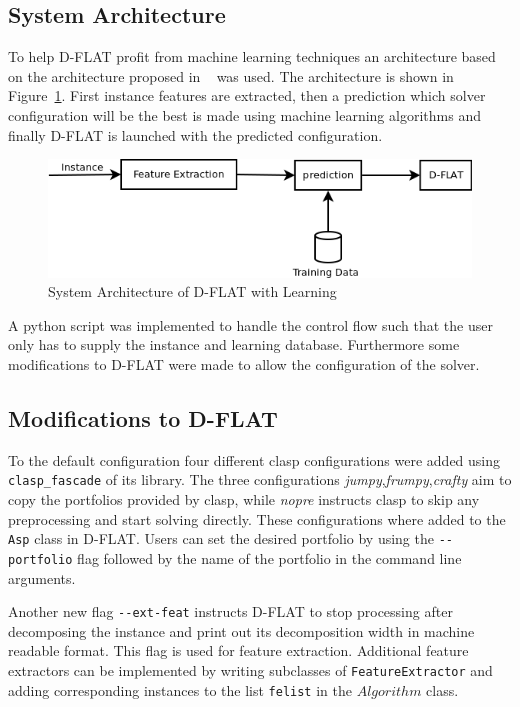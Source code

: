 \subsection{System Architecture}
To help D-FLAT profit from machine learning techniques an architecture based on the architecture proposed in ~\cite{DBLP:conf/lpnmr/GebserKKSSZ11} was used. The architecture is shown in Figure~\ref{impl:sysarch}. First instance features are extracted, then a prediction which solver configuration will be the best is made using machine learning algorithms and finally D-FLAT is launched with the predicted configuration.
\begin{figure}[h]
	\center
	\includegraphics[scale=0.6]{figures/sysarch.png}
	\caption{System Architecture of D-FLAT with Learning\label{impl:sysarch}}
\end{figure}
A python script was implemented to handle the control flow such that the user only has to supply the instance and learning database. Furthermore some modifications to D-FLAT were made to allow the configuration of the solver.

\subsection{Modifications to D-FLAT}
To the default configuration four different clasp configurations were added using \lstinline$clasp_fascade$ of its library. The three configurations \emph{jumpy},\emph{frumpy},\emph{crafty} aim to copy the portfolios provided by clasp, while \emph{nopre} instructs clasp to skip any preprocessing and start solving directly. These configurations where added to the \lstinline$Asp$ class in D-FLAT. Users can set the desired portfolio by using the \lstinline$--portfolio$ flag followed by the name of the portfolio in the command line arguments.

Another new flag \lstinline$--ext-feat$ instructs D-FLAT to stop processing after decomposing the instance and print out its decomposition width in machine readable format. This flag is used for feature extraction. Additional feature extractors can be implemented by writing subclasses of \lstinline$FeatureExtractor$ and adding corresponding instances to the list \lstinline$felist$ in the $Algorithm$ class.
